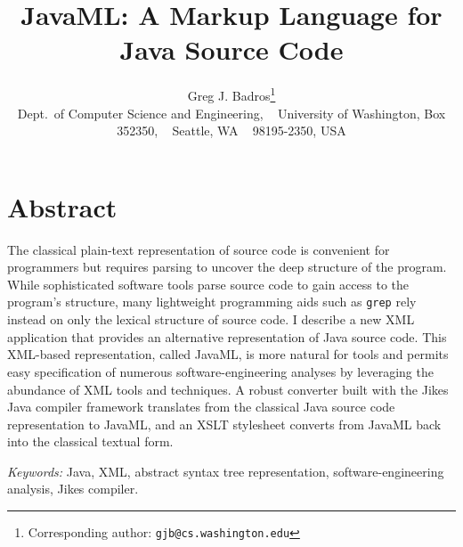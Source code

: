 \documentclass{article}
\begin{document}

\newcommand{\smtexttt}[1]{{\small\texttt{#1}}}
\newcommand{\ignore}[1]{}
\newcommand{\href}[2]{#2}
\newenvironment{smverbatim}{\small \begin{verbatim}}{\end{verbatim}}
\newenvironment{shellcommand}{\begin{verbatim}}{\end{verbatim}}
\newenvironment{shelloutput}{\begin{verbatim}}{\end{verbatim}}

\title{JavaML: A Markup Language for Java Source Code}
\author{Greg J. Badros\thanks{Corresponding author: \smtexttt{gjb@cs.washington.edu}}
\\ \small
Dept.\ of Computer Science and Engineering, ~
University of Washington, Box 352350, ~
Seattle, WA ~ 98195-2350, USA}
\date{}

\maketitle
\thispagestyle{empty}

\vspace*{-1cm}

\section*{Abstract}
The classical plain-text representation of source code is convenient for
programmers but requires parsing to uncover the deep structure of the
program.  While sophisticated software tools parse source code to gain
access to the program's structure, many lightweight programming aids
such as \smtexttt{grep} rely instead on only the lexical structure of
source code.  I describe a new XML application that provides an
alternative representation of Java source code. This XML-based
representation, called JavaML, is more natural for tools and permits
easy specification of numerous software-engineering analyses by
leveraging the abundance of XML tools and techniques.  A robust
converter built with the Jikes Java compiler framework translates
from the classical Java source code representation to JavaML, and an
XSLT stylesheet converts from JavaML back into the classical textual
form.

\vspace*{.2cm} 
\noindent \textit{Keywords:}
Java, XML, abstract syntax tree representation, software-engineering
analysis, Jikes compiler.
\end{document}
